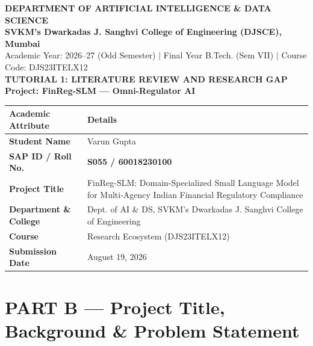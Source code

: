 \documentclass[11pt,a4paper]{article}
\begin{document}
\begin{center}
    {\large\bfseries\textcolor{headerblue}{DEPARTMENT OF ARTIFICIAL INTELLIGENCE \& DATA SCIENCE}}\\[0.2em]
    {\normalsize\bfseries SVKM's Dwarkadas J. Sanghvi College of Engineering (DJSCE), Mumbai}\\[0.4em]
    {\small\textcolor{subgray}{Academic Year: 2026--27 (Odd Semester) $|$ Final Year B.Tech. (Sem VII) $|$ Course Code: DJS23ITELX12}}\\[1.5em]
    
    {\Large\bfseries\textcolor{darkslate}{TUTORIAL 1: LITERATURE REVIEW AND RESEARCH GAP}}\\[0.5em]
    {\normalsize\bfseries Project: FinReg-SLM --- Omni-Regulator AI}\\[1.2em]
\end{center}

\begin{table}[h!]
\centering
\small
\begin{tabularx}{\textwidth}{|l|X|}
\hline
\rowcolor{tablehead} \textbf{Academic Attribute} & \textbf{Details} \\ \hline
\textbf{Student Name} & Varun Gupta \\ \hline
\textbf{SAP ID / Roll No.} & \textbf{S055 / 60018230100} \\ \hline
\textbf{Project Title} & FinReg-SLM: Domain-Specialized Small Language Model for Multi-Agency Indian Financial Regulatory Compliance \\ \hline
\textbf{Department \& College} & Dept. of AI \& DS, SVKM's Dwarkadas J. Sanghvi College of Engineering \\ \hline
\textbf{Course} & Research Ecosystem (DJS23ITELX12) \\ \hline
\textbf{Submission Date} & August 19, 2026 \\ \hline
\end{tabularx}
\end{table}

\vspace{0.8em}

\section*{PART B --- Project Title, Background \& Problem Statement}
\end{document}
